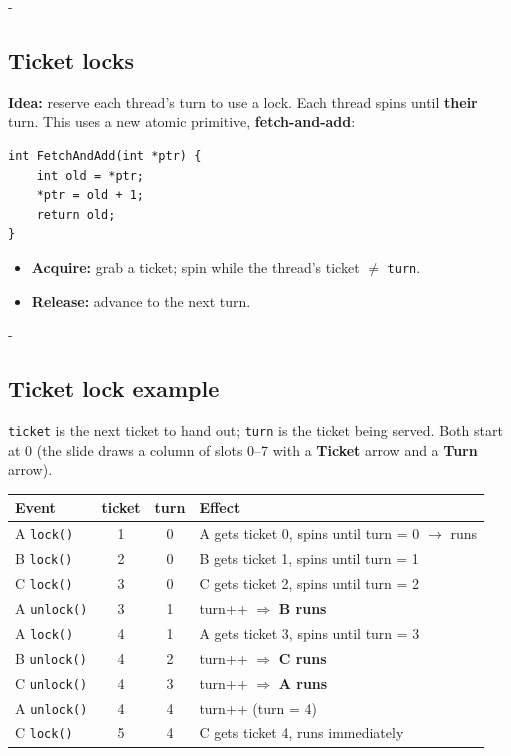 \documentclass[11pt,a4paper]{article}
\makeatletter
\newcommand{\keepspace}[1]{\par\penalty-100\begingroup
  \setlength{\dimen@}{#1}\dimen@ii\pagegoal\advance\dimen@ii-\pagetotal
  \ifdim\dimen@>\dimen@ii\ifdim\dimen@ii>\z@\vfil\fi\break\fi\endgroup}
\makeatother
\begin{document}
\keepspace{15\baselineskip}
\subsection{Ticket locks}

\textbf{Idea:} reserve each thread's turn to use a lock. Each thread spins
until \textbf{their} turn. This uses a new atomic primitive,
\textbf{fetch-and-add}:

\begin{lstlisting}
int FetchAndAdd(int *ptr) {
    int old = *ptr;
    *ptr = old + 1;
    return old;
}
\end{lstlisting}

\begin{itemize}
  \item \textbf{Acquire:} grab a ticket; spin while the thread's ticket
        \(\neq\) \texttt{turn}.
  \item \textbf{Release:} advance to the next turn.
\end{itemize}

\keepspace{20\baselineskip}
\subsection{Ticket lock example}

\texttt{ticket} is the next ticket to hand out; \texttt{turn} is the ticket
being served. Both start at 0 (the slide draws a column of slots 0--7 with
a \textbf{Ticket} arrow and a \textbf{Turn} arrow).

\begin{center}
\renewcommand{\arraystretch}{1.1}
\begin{tabular}{@{}lccl@{}}
  \toprule
  \textbf{Event} & \textbf{ticket} & \textbf{turn} & \textbf{Effect} \\
  \midrule
  A \texttt{lock()}   & 1 & 0 & A gets ticket 0, spins until turn = 0 \(\to\) runs \\
  B \texttt{lock()}   & 2 & 0 & B gets ticket 1, spins until turn = 1 \\
  C \texttt{lock()}   & 3 & 0 & C gets ticket 2, spins until turn = 2 \\
  A \texttt{unlock()} & 3 & 1 & turn++ \(\Rightarrow\) \textbf{B runs} \\
  A \texttt{lock()}   & 4 & 1 & A gets ticket 3, spins until turn = 3 \\
  B \texttt{unlock()} & 4 & 2 & turn++ \(\Rightarrow\) \textbf{C runs} \\
  C \texttt{unlock()} & 4 & 3 & turn++ \(\Rightarrow\) \textbf{A runs} \\
  A \texttt{unlock()} & 4 & 4 & turn++ (turn = 4) \\
  C \texttt{lock()}   & 5 & 4 & C gets ticket 4, runs immediately \\
  \bottomrule
\end{tabular}
\end{center}
\end{document}
